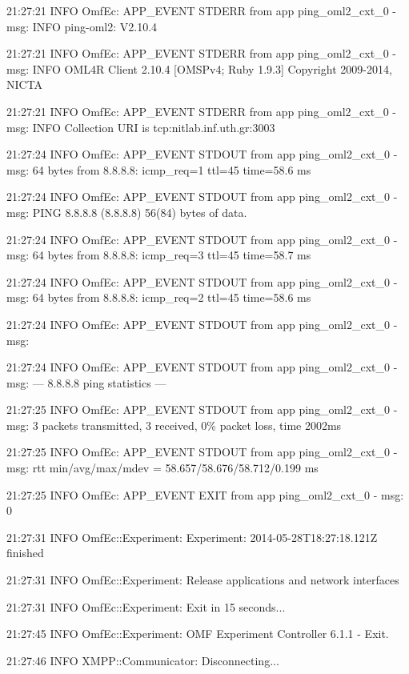 \documentclass[letterpaper,10pt,english]{sphinxmanual}
\begin{document}
\begin{DUlineblock}{0em}
\item[] 21:27:21 INFO  OmfEc: APP\_EVENT STDERR from app ping\_oml2\_cxt\_0 - msg:  INFO ping-oml2: V2.10.4
\item[] 21:27:21 INFO  OmfEc: APP\_EVENT STDERR from app ping\_oml2\_cxt\_0 - msg: INFO   OML4R Client 2.10.4 {[}OMSPv4; Ruby 1.9.3{]} Copyright 2009-2014, NICTA
\item[] 21:27:21 INFO  OmfEc: APP\_EVENT STDERR from app ping\_oml2\_cxt\_0 - msg: INFO   Collection URI is tcp:nitlab.inf.uth.gr:3003
\item[] 21:27:24 INFO  OmfEc: APP\_EVENT STDOUT from app ping\_oml2\_cxt\_0 - msg: 64 bytes from 8.8.8.8: icmp\_req=1 ttl=45 time=58.6 ms
\item[] 21:27:24 INFO  OmfEc: APP\_EVENT STDOUT from app ping\_oml2\_cxt\_0 - msg: PING 8.8.8.8 (8.8.8.8) 56(84) bytes of data.
\item[] 21:27:24 INFO  OmfEc: APP\_EVENT STDOUT from app ping\_oml2\_cxt\_0 - msg: 64 bytes from 8.8.8.8: icmp\_req=3 ttl=45 time=58.7 ms
\item[] 21:27:24 INFO  OmfEc: APP\_EVENT STDOUT from app ping\_oml2\_cxt\_0 - msg: 64 bytes from 8.8.8.8: icmp\_req=2 ttl=45 time=58.6 ms
\item[] 21:27:24 INFO  OmfEc: APP\_EVENT STDOUT from app ping\_oml2\_cxt\_0 - msg:
\item[] 21:27:24 INFO  OmfEc: APP\_EVENT STDOUT from app ping\_oml2\_cxt\_0 - msg: --- 8.8.8.8 ping statistics ---
\item[] 21:27:25 INFO  OmfEc: APP\_EVENT STDOUT from app ping\_oml2\_cxt\_0 - msg: 3 packets transmitted, 3 received, 0\% packet loss, time 2002ms
\item[] 21:27:25 INFO  OmfEc: APP\_EVENT STDOUT from app ping\_oml2\_cxt\_0 - msg: rtt min/avg/max/mdev = 58.657/58.676/58.712/0.199 ms
\item[] 21:27:25 INFO  OmfEc: APP\_EVENT EXIT from app ping\_oml2\_cxt\_0 - msg: 0
\item[] 21:27:31 INFO  OmfEc::Experiment: Experiment: 2014-05-28T18:27:18.121Z finished
\item[] 21:27:31 INFO  OmfEc::Experiment: Release applications and network interfaces
\item[] 21:27:31 INFO  OmfEc::Experiment: Exit in 15 seconds...
\item[] 21:27:45 INFO  OmfEc::Experiment: OMF Experiment Controller 6.1.1 - Exit.
\item[] 21:27:46 INFO  XMPP::Communicator: Disconnecting...
\end{DUlineblock}
\end{document}
